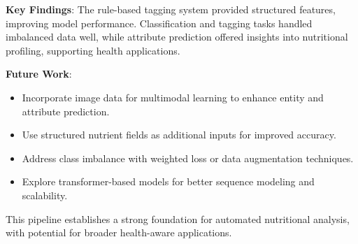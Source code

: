 \documentclass[11pt]{article}
\begin{document}
\textbf{Key Findings}: The rule-based tagging system provided structured features, improving model performance. Classification and tagging tasks handled imbalanced data well, while attribute prediction offered insights into nutritional profiling, supporting health applications.

\textbf{Future Work}:
\begin{itemize}[noitemsep]
    \item Incorporate image data for multimodal learning to enhance entity and attribute prediction.
    \item Use structured nutrient fields as additional inputs for improved accuracy.
    \item Address class imbalance with weighted loss or data augmentation techniques.
    \item Explore transformer-based models for better sequence modeling and scalability.
\end{itemize}

This pipeline establishes a strong foundation for automated nutritional analysis, with potential for broader health-aware applications.

\end{document}

